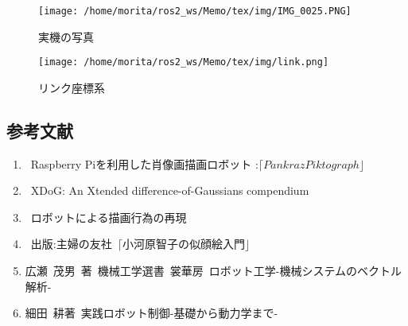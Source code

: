 \documentclass[a4j]{jarticle}			%
\begin{document}
\begin{figure}[htbp]
\begin{center}
\texttt{[image: /home/morita/ros2\_ws/Memo/tex/img/IMG\_0025.PNG]}
\caption{実機の写真}
\end{center}
\end{figure}

\begin{figure}[htbp]
\begin{center}
\texttt{[image: /home/morita/ros2\_ws/Memo/tex/img/link.png]}
\caption{リンク座標系}
\end{center}
\end{figure}

\begin{multicols}{2} %

\section{参考文献}

\begin{enumerate}
\item {}\rbrack \ Raspberry Piを利用した肖像画描画ロボット :$ \lceil Pankraz Piktograph \rfloor$ \\
\item {}\rbrack \ XDoG: An Xtended difference-of-Gaussians compendium \\
\item {}\rbrack \ ロボットによる描画行為の再現\\
\item {}\rbrack \ 出版:主婦の友社\ $\lceil \text{小河原智子の似顔絵入門} \rfloor$\\
\item 広瀬\ 茂男\ 著\ 機械工学選書\ 裳華房\ ロボット工学-機械システムのベクトル解析-\\
\item 細田\ 耕著\ 実践ロボット制御-基礎から動力学まで- \\
\end{enumerate}

\end{multicols}
\end{document}
